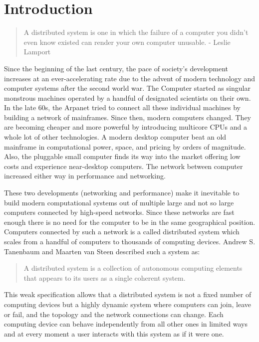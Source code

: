 
\section{Introduction}
\label{sec_1}

\begin{quote}
A distributed system is one in which the failure of a computer you didn't even
know existed can render your own computer unusable. - Leslie Lamport
\end{quote}

Since the beginning of the last century, the pace of society's development increases
at an ever-accelerating rate due to the advent of modern technology and computer
systems after the second world war. The Computer started as singular
monstrous machines operated by a handful of designated scientists on
their own. In the late 60s, the Arpanet tried to connect all these individual
machines by building a network of mainframes. Since then,
modern computers changed. They are becoming cheaper and more powerful
by introducing multicore CPUs and a whole lot of other technologies.
A modern desktop computer beat an old mainframe in computational power,
space, and pricing by orders of magnitude. Also, the pluggable small computer
finds its way into the market offering low costs and experience near-desktop
computers. The network between computer increased either way in performance and
networking.

These two developments (networking and performance) make it inevitable
to build modern computational systems out of multiple large and not so large computers
connected by high-speed networks. Since these networks are fast
enough there is no need for the computer to be in the same geographical
position. Computers connected by such a network is a called distributed system
which scales from a handful of computers to thousands of computing devices. 
Andrew S. Tanenbaum and Maarten van Steen described such a system as:

\begin{quote}
  A distributed system is a collection of autonomous computing elements
  that appears to its users as a single coherent system.~\cite{tanenbaum2017distributed}
\end{quote}

This weak specification allows that a distributed system is not a fixed
number of computing devices but a highly dynamic system where computers can
join, leave or fail, and the topology and the network connections can change.
Each computing device can behave independently from all other ones in limited
ways and at every moment a user interacts with this system as if it were one.

